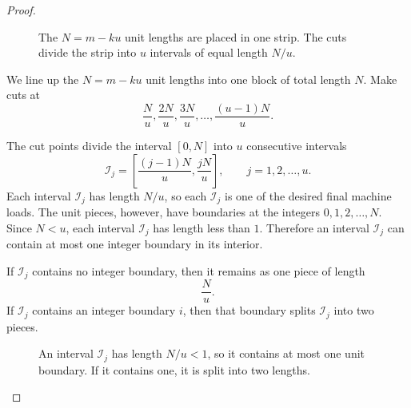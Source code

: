 \documentclass[%
english, titlepage=false %
]{./tum-templates/book/tumbook}
\begin{document}
\begin{proof}
\begin{figure}[ht]
\caption{The \(N=m-ku\) unit lengths are placed in one strip. The cuts divide the strip into \(u\) intervals of equal length \(N/u\).}
\label{fig:construction}
\end{figure}


We line up the \(N=m-ku\) unit lengths into one block of total length \(N\). Make cuts at
\[
\frac{N}{u},\frac{2N}{u},\frac{3N}{u},\ldots,\frac{(u-1)N}{u}.
\]

The cut points divide the interval \([0,N]\) into \(u\) consecutive intervals
\[
\mathcal{I}_j=\left[\frac{(j-1)N}{u},\frac{jN}{u}\right],
\qquad
j=1,2,\ldots,u.
\]
Each interval \(\mathcal{I}_j\) has length \(N/u\), so each \(\mathcal{I}_j\) is one of the desired final machine loads.
The unit pieces, however, have boundaries at the integers $0,1,2,\ldots,N$.
Since \(N<u\), each interval \(\mathcal{I}_j\) has length less than \(1\). Therefore an interval \(\mathcal{I}_j\) can contain at most one integer boundary in its interior.

If \(\mathcal{I}_j\) contains no integer boundary, then it remains as one piece of length
\[
\frac{N}{u}.
\]
If \(\mathcal{I}_j\) contains an integer boundary \(i\), then that boundary splits \(\mathcal{I}_j\) into two pieces.

\begin{figure}[ht]
\centering
{}
\caption{An interval \(\mathcal{I}_j\) has length \(N/u<1\), so it contains at most one unit boundary. If it contains one, it is split into two lengths.}
\label{fig:interval}
\end{figure}


\end{proof}
\end{document}
